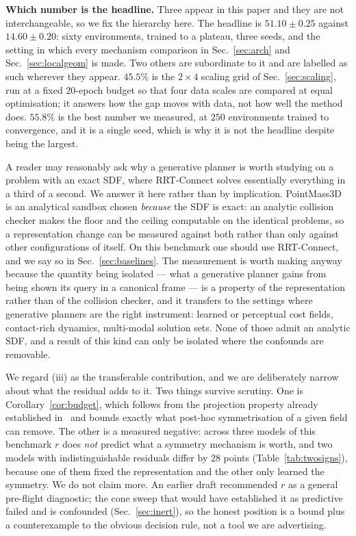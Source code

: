 \documentclass[10pt,twocolumn,letterpaper]{article}
\theoremstyle{plain}
\begin{document}
\textbf{Which number is the headline.} Three appear in this paper and they are
not interchangeable, so we fix the hierarchy here. The headline is
$\mathbf{51.10\pm0.25}$ against $14.60\pm0.20$: sixty environments, trained to a
plateau, three seeds, and the setting in which every mechanism comparison in
Sec.~\ref{sec:arch} and Sec.~\ref{sec:localgeom} is made. Two others are
subordinate to it and are labelled as such wherever they appear.
$45.5\%$ is the $2\times4$ scaling grid of Sec.~\ref{sec:scaling}, run at a
fixed $20$-epoch budget so that four data scales are compared at equal
optimisation; it answers how the gap moves with data, not how well the method
does. $55.8\%$ is the best number we measured, at $250$ environments trained to
convergence, and it is a single seed, which is why it is not the headline
despite being the largest.

A reader may reasonably ask why a generative planner is worth studying on a
problem with an exact SDF, where RRT-Connect solves essentially everything in a
third of a second. We answer it here rather than by implication. PointMass3D is
an analytical sandbox chosen \emph{because} the SDF is exact: an analytic
collision checker makes the floor and the ceiling computable on the identical
problems, so a representation change can be measured against both rather than
only against other configurations of itself. On this benchmark one should use
RRT-Connect, and we say so in Sec.~\ref{sec:baselines}. The measurement is worth
making anyway because the quantity being isolated --- what a generative planner
gains from being shown its query in a canonical frame --- is a property of the
representation rather than of the collision checker, and it transfers to the
settings where generative planners are the right instrument: learned or
perceptual cost fields, contact-rich dynamics, multi-modal solution sets. None of
those admit an analytic SDF, and a result of this kind can only be isolated where
the confounds are removable.

We regard (iii) as the transferable contribution, and we are deliberately narrow
about what the residual adds to it. Two things survive scrutiny. One is
Corollary~\ref{cor:budget}, which follows from the projection property already
established in~\cite{elesedy2021strict,puny2022fa} and bounds exactly what
post-hoc symmetrisation of a given field can remove. The other is a measured
negative: across three models of this benchmark $r$ does \emph{not} predict what a
symmetry mechanism is worth, and two models with indistinguishable residuals
differ by $28$ points (Table~\ref{tab:twosigns}), because one of them fixed the
representation and the other only learned the symmetry. We do not claim more.
An earlier draft recommended $r$ as a general pre-flight diagnostic; the cone
sweep that would have established it as predictive failed and is confounded
(Sec.~\ref{sec:inert}), so the honest position is a bound plus a counterexample to
the obvious decision rule, not a tool we are advertising.
\end{document}
